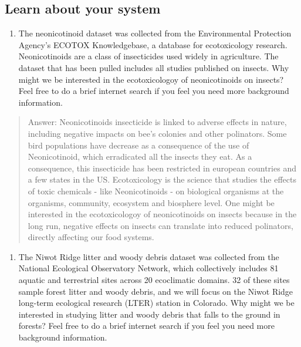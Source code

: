 \documentclass[
]{article}
\providecommand{\tightlist}{%
  \setlength{\itemsep}{0pt}\setlength{\parskip}{0pt}}
\begin{document}
\hypertarget{learn-about-your-system}{%
\subsection{Learn about your system}\label{learn-about-your-system}}

\begin{enumerate}
\def\labelenumi{\arabic{enumi}.}
\setcounter{enumi}{1}
\tightlist
\item
  The neonicotinoid dataset was collected from the Environmental
  Protection Agency's ECOTOX Knowledgebase, a database for ecotoxicology
  research. Neonicotinoids are a class of insecticides used widely in
  agriculture. The dataset that has been pulled includes all studies
  published on insects. Why might we be interested in the ecotoxicologoy
  of neonicotinoids on insects? Feel free to do a brief internet search
  if you feel you need more background information.
\end{enumerate}

\begin{quote}
Answer: Neonicotinoids insecticide is linked to adverse effects in
nature, including negative impacts on bee's colonies and other
polinators. Some bird populations have decrease as a consequence of the
use of Neonicotinoid, which erradicated all the insects they eat. As a
consequence, this insecticide has been restricted in european countries
and a few states in the US. Ecotoxicology is the science that studies
the effects of toxic chemicals - like Neonicotinoids - on biological
organisms at the organisms, community, ecosystem and biosphere level.
One might be interested in the ecotoxicologoy of neonicotinoids on
insects because in the long run, negative effects on insects can
translate into reduced polinators, directly affecting our food systems.
\end{quote}

\begin{enumerate}
\def\labelenumi{\arabic{enumi}.}
\setcounter{enumi}{2}
\tightlist
\item
  The Niwot Ridge litter and woody debris dataset was collected from the
  National Ecological Observatory Network, which collectively includes
  81 aquatic and terrestrial sites across 20 ecoclimatic domains. 32 of
  these sites sample forest litter and woody debris, and we will focus
  on the Niwot Ridge long-term ecological research (LTER) station in
  Colorado. Why might we be interested in studying litter and woody
  debris that falls to the ground in forests? Feel free to do a brief
  internet search if you feel you need more background information.
\end{enumerate}
\end{document}
